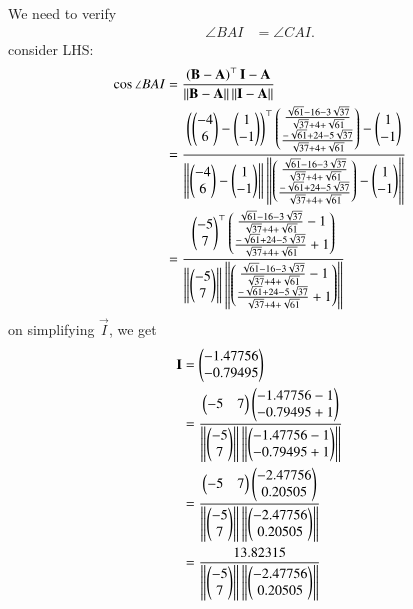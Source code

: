\documentclass[journal,12pt,twocolumn]{IEEEtran}
\theoremstyle{remark}
\begin{document}
We need to verify \begin{align}\angle BAI &= \angle CAI.\end{align}
consider LHS:
\begin{align} 
\cos{\angle BAI} &= \frac{\left(\mathbf{B} - \mathbf{A}\right)^{\top}\mathbf{I} - \mathbf{A}}{\left\lVert\mathbf{B} - \mathbf{A}\right\rVert \left\lVert \mathbf{I} - \mathbf{A}\right\rVert}\\
 &= \frac{\left(\begin{pmatrix}-4\\6\end{pmatrix} - \begin{pmatrix}1\\-1\end{pmatrix}\right)^{\top}\begin{pmatrix}\frac{{\sqrt{61}-16-3\sqrt{37}}}{\sqrt{37}+4+\sqrt{61}}\\\frac{{-\sqrt{61}+24-5\sqrt{37}}}{\sqrt{37}+4+\sqrt{61}}\end{pmatrix} - \begin{pmatrix}1\\-1\end{pmatrix}}{\left\lVert\begin{pmatrix}-4\\6\end{pmatrix} - \begin{pmatrix}1\\-1\end{pmatrix}\right\rVert \left\lVert \begin{pmatrix}\frac{{\sqrt{61}-16-3\sqrt{37}}}{\sqrt{37}+4+\sqrt{61}}\\\frac{{-\sqrt{61}+24-5\sqrt{37}}}{\sqrt{37}+4+\sqrt{61}}\end{pmatrix} - \begin{pmatrix}1\\-1\end{pmatrix}\right\rVert}\\
 &= \frac{\begin{pmatrix}-5\\7\end{pmatrix}^{\top}\begin{pmatrix}\frac{{\sqrt{61}-16-3\sqrt{37}}}{\sqrt{37}+4+\sqrt{61}}-1\\\frac{{-\sqrt{61}+24-5\sqrt{37}}}{\sqrt{37}+4+\sqrt{61}}+1\end{pmatrix}}{\left\lVert\begin{pmatrix}-5\\7\end{pmatrix}\right\rVert \left\lVert \begin{pmatrix}\frac{{\sqrt{61}-16-3\sqrt{37}}}{\sqrt{37}+4+\sqrt{61}}-1\\\frac{{-\sqrt{61}+24-5\sqrt{37}}}{\sqrt{37}+4+\sqrt{61}}+1\end{pmatrix}\right\rVert}
\end{align}
on simplifying $\vec{I}$, we get
\begin{align}
\mathbf{I} &= \begin{pmatrix}-1.47756\\-0.79495\end{pmatrix}\\
&= \frac{\begin{pmatrix}-5&7\end{pmatrix}\begin{pmatrix}-1.47756-1\\-0.79495+1\end{pmatrix}}{\left\lVert\begin{pmatrix}-5\\7\end{pmatrix}\right\rVert \left\lVert \begin{pmatrix}-1.47756-1\\-0.79495+1\end{pmatrix}\right\rVert}\\
&= \frac{\begin{pmatrix}-5&7\end{pmatrix}\begin{pmatrix}-2.47756\\0.20505\end{pmatrix}}{\left\lVert\begin{pmatrix}-5\\7\end{pmatrix}\right\rVert \left\lVert \begin{pmatrix}-2.47756\\0.20505\end{pmatrix}\right\rVert}\\
&= \frac{13.82315}{\left\lVert\begin{pmatrix}-5\\7\end{pmatrix}\right\rVert \left\lVert\begin{pmatrix}-2.47756\\0.20505\end{pmatrix}\right\rVert}
\end{align}
\end{document}
